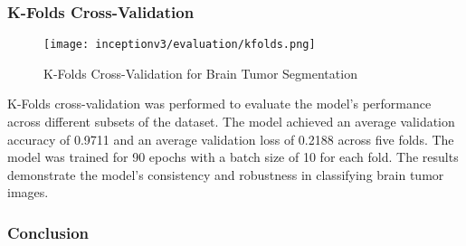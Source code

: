 \subsubsection{K-Folds Cross-Validation}

\begin{figure}[H]
  \begin{center}
    \texttt{[image: inceptionv3/evaluation/kfolds.png]}
  \end{center}
  \caption{K-Folds Cross-Validation for Brain Tumor Segmentation}\label{f:inceptionv3_kfolds}
\end{figure}


K-Folds cross-validation was performed to evaluate the model's performance across different subsets of the dataset. The model achieved an average validation accuracy of 0.9711 and an average validation loss of 0.2188 across five folds. The model was trained for 90 epochs with a batch size of 10 for each fold. The results demonstrate the model's consistency and robustness in classifying brain tumor images.

\subsubsection{Conclusion}
